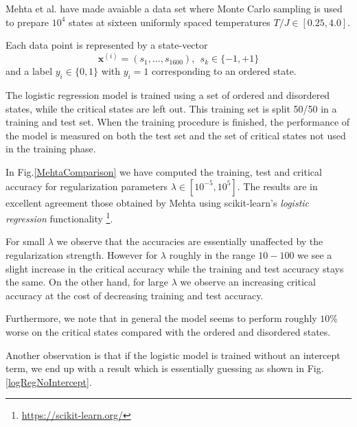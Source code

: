 \documentclass[a4paper, twocolumn]{article}
\begin{document}
Mehta et al.\autocite{mehta2018highbias} 
have made avaiable a data set where Monte Carlo sampling is used to prepare $10^4$ states at sixteen uniformly spaced 
temperatures $T/J \in [0.25,4.0]$. 

Each data point is represented by a state-vector 
\begin{equation}
 \mathbf{x}^{(i)} = (s_1, \dots,s_{1600}), \ \ s_k \in \{-1,+1\}
\end{equation}
and a label $y_i \in \{0,1\}$ with $y_i = 1$ corresponding to an ordered state.


The logistic regression model is trained using a set of ordered and disordered states, while the critical states are left out. 
This training set is split 50/50 in a training and test set. When the training procedure is finished, the performance of 
the model is measured on both the test set and the set of critical states not used in the training phase. 

In Fig.\ref{MehtaComparison} we have computed the training, test and critical accuracy for regularization parameters 
$\lambda \in [10^{-5},10^{5}]$. The results are in excellent agreement those obtained by Mehta using scikit-learn's \textit{logistic regression}
functionality \footnote{\href{https://scikit-learn.org/stable/modules/generated/sklearn.linear\_model.LogisticRegression.html}{https://scikit-learn.org/}}.

For small $\lambda$ we observe that the accuracies are essentially unaffected by the regularization strength. 
However for $\lambda$ roughly in the range $10-100$ we see a slight increase in the critical accuracy while the training and 
test accuracy stays the same. On the other hand, for large $\lambda$ we observe an increasing critical accuracy at the cost of 
decreasing training and test accuracy. 

Furthermore, we note that in general the model seems to perform roughly $10$\% worse on 
the critical states compared with the ordered and disordered states.  

Another observation is that if the logistic model is trained without an intercept term, we end up with a result 
which is essentially guessing as shown in Fig.\ref{logRegNoIntercept}.
\end{document}

